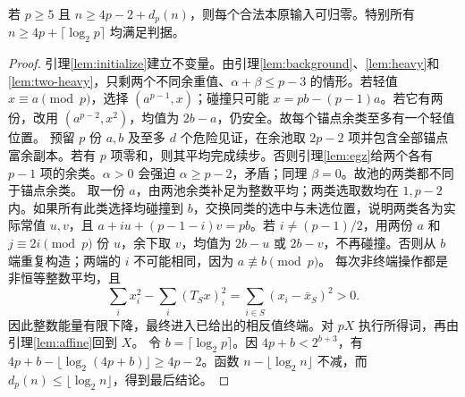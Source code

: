 \begin{lemma}\label{lem:integer-range}
若 $p\ge5$ 且 $n\ge4p-2+d_p(n)$，则每个合法本原输入可归零。特别所有 $n\ge4p+\lceil\log_2p\rceil$ 均满足判据。
\end{lemma}
\begin{proof}
引理\ref{lem:initialize}建立不变量。由引理\ref{lem:background}、\ref{lem:heavy}和\ref{lem:two-heavy}，只剩两个不同余重值、$\alpha+\beta\le p-3$ 的情形。若轻值 $x\equiv a\pmod p$，选择 $(a^{p-1},x)$；碰撞只可能 $x=pb-(p-1)a$。若它有两份，改用 $(a^{p-2},x^2)$，均值为 $2b-a$，仍安全。故每个锚点余类至多有一个轻值位置。
预留 $p$ 份 $a,b$ 及至多 $d$ 个危险见证，在余池取 $2p-2$ 项并包含全部锚点富余副本。若有 $p$ 项零和，则其平均完成续步。否则引理\ref{lem:egz}给两个各有 $p-1$ 项的余类。$\alpha>0$ 会强迫 $\alpha\ge p-2$，矛盾；同理 $\beta=0$。故池的两类都不同于锚点余类。
取一份 $a$，由两池余类补足为整数平均；两类选取数均在 $1,p-2$ 内。如果所有此类选择均碰撞到 $b$，交换同类的选中与未选位置，说明两类各为实际常值 $u,v$，且 $a+iu+(p-1-i)v=pb$。若 $i\ne(p-1)/2$，用两份 $a$ 和 $j\equiv2i\pmod p$ 份 $u$，余下取 $v$，均值为 $2b-u$ 或 $2b-v$，不再碰撞。否则从 $b$ 端重复构造；两端的 $i$ 不可能相同，因为 $a\not\equiv b\pmod p$。
每次非终端操作都是非恒等整数平均，且
\[\sum_i x_i^2-\sum_i(T_Sx)_i^2=\sum_{i\in S}(x_i-\bar x_S)^2>0.
\]
因此整数能量有限下降，最终进入已给出的相反值终端。对 $pX$ 执行所得词，再由引理\ref{lem:affine}回到 $X$。
令 $b=\lceil\log_2p\rceil$。因 $4p+b<2^{b+3}$，有 $4p+b-\lfloor\log_2(4p+b)\rfloor\ge4p-2$。函数 $n-\lfloor\log_2n\rfloor$ 不减，而 $d_p(n)\le\lfloor\log_2n\rfloor$，得到最后结论。
\end{proof}

